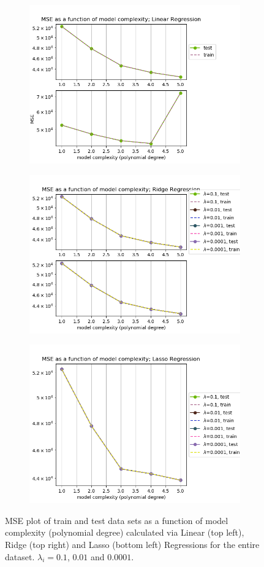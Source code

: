 \begin{figure}[!htbp]
\begin{subfigure}{\textwidth}
  \centering
  \includegraphics[width=0.55\linewidth]{images/real/real_linear_mse_p05_nreal.png}
\end{subfigure}
\begin{subfigure}{\textwidth}
  \centering
  \includegraphics[width=0.55\linewidth]{images/real/real_ridge_mse_p05_nreal.png}
\end{subfigure}
\begin{subfigure}{\textwidth}
  \centering
  \includegraphics[width=0.55\linewidth]{images/real/real_lasso_mse_p05_nreal.png}
\end{subfigure}
\caption{MSE plot of train and test data sets as a function of model complexity (polynomial degree) calculated via Linear (top left), Ridge (top right) and Lasso (bottom left) Regressions  for the entire dataset. $\lambda_i = 0.1$, $0.01$ and $0.0001$.}
\label{fig:lasso-mse-real-all}
\end{figure}
 
 
 
 
